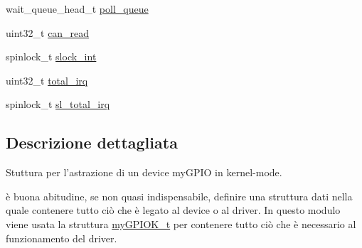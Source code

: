 \begin{DoxyCompactItemize}
\item 
wait\+\_\+queue\+\_\+head\+\_\+t \hyperlink{structmy_g_p_i_o_k__t_a2080617f88cafd765430573afe7701d1}{poll\+\_\+queue}
\item 
uint32\+\_\+t \hyperlink{structmy_g_p_i_o_k__t_a2b8d3d6037e2d2fdadbd7c2fd995f0a1}{can\+\_\+read}
\item 
spinlock\+\_\+t \hyperlink{structmy_g_p_i_o_k__t_a1e1ddf972b4dc84dd331a0c72e5d9895}{slock\+\_\+int}
\item 
uint32\+\_\+t \hyperlink{structmy_g_p_i_o_k__t_a2da711ac290a9613b8d8af97f122b997}{total\+\_\+irq}
\item 
spinlock\+\_\+t \hyperlink{structmy_g_p_i_o_k__t_ac41bbc7fe03ef25b7f468275fb565d78}{sl\+\_\+total\+\_\+irq}
\end{DoxyCompactItemize}


\subsection{Descrizione dettagliata}
Stuttura per l'astrazione di un device my\+G\+P\+I\+O in kernel-\/mode. 

è buona abitudine, se non quasi indispensabile, definire una struttura dati nella quale contenere tutto ciò che è legato al device o al driver. In questo modulo viene usata la struttura \hyperlink{structmy_g_p_i_o_k__t}{my\+G\+P\+I\+O\+K\+\_\+t} per contenere tutto ciò che è necessario al funzionamento del driver. 

